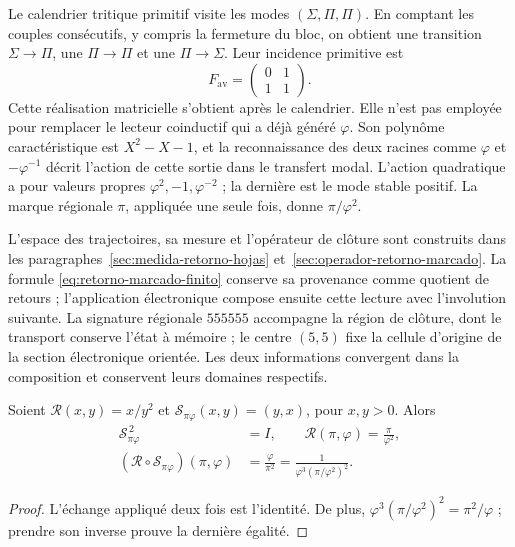 Le calendrier tritique primitif visite les modes
\((\Sigma,\Pi,\Pi)\). En comptant les couples consécutifs, y compris la
fermeture du bloc, on obtient une transition \(\Sigma\to\Pi\), une
\(\Pi\to\Pi\) et une \(\Pi\to\Sigma\). Leur incidence primitive est
\[
 F_{\mathrm{av}}=\begin{pmatrix}0&1\\1&1\end{pmatrix}.
\]
Cette réalisation matricielle s'obtient après le calendrier. Elle n'est pas employée pour remplacer le lecteur coinductif qui a déjà généré \(\varphi\). Son polynôme caractéristique est \(X^2-X-1\), et la reconnaissance des deux racines comme \(\varphi\) et \(-\varphi^{-1}\) décrit l'action de cette sortie dans le transfert modal. L'action quadratique a pour valeurs propres \(\varphi^2,-1,\varphi^{-2}\) ; la dernière est le mode stable positif. La marque régionale \(\pi\), appliquée une seule fois, donne \(\pi/\varphi^2\).

L'espace des trajectoires, sa mesure et l'opérateur de clôture sont
construits dans les paragraphes~\ref{sec:medida-retorno-hojas}
et~\ref{sec:operador-retorno-marcado}. La formule
\eqref{eq:retorno-marcado-finito} conserve sa provenance comme quotient
de retours ; l'application électronique compose ensuite cette lecture
avec l'involution suivante. La signature régionale \(555555\) accompagne
la région de clôture, dont le transport conserve l'état à mémoire ;
le centre \((5,5)\) fixe la cellule d'origine de la section électronique
orientée. Les deux informations convergent dans la composition et conservent
leurs domaines respectifs.

\begin{lemma}
Soient \(\mathcal R(x,y)=x/y^2\) et
\(\mathscr S_{\pi\varphi}(x,y)=(y,x)\), pour \(x,y>0\).
Alors
\begin{equation}
 \begin{aligned}
 \mathscr S_{\pi\varphi}^{\,2}&=I,\qquad
 \mathcal R(\pi,\varphi)=\frac{\pi}{\varphi^2},\\
 (\mathcal R\circ\mathscr S_{\pi\varphi})(\pi,\varphi)
 &=\frac{\varphi}{\pi^2}
 =\frac1{\varphi^3(\pi/\varphi^2)^2}.
 \end{aligned}
 \label{eq:el-bisagra}
\end{equation}
\end{lemma}
\begin{proof}
L'échange appliqué deux fois est l'identité. De plus,
\(\varphi^3(\pi/\varphi^2)^2=\pi^2/\varphi\) ; prendre son inverse prouve
la dernière égalité.
\end{proof}

